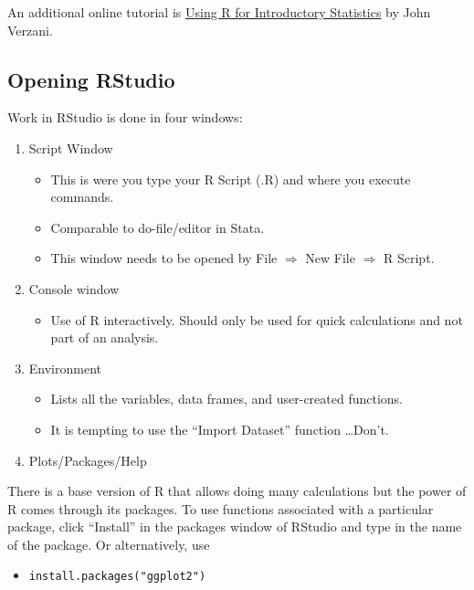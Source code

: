 \documentclass[
]{article}
\providecommand{\tightlist}{%
  \setlength{\itemsep}{0pt}\setlength{\parskip}{0pt}}
\begin{document}
An additional online tutorial is \href{https://cran.r-project.org/doc/contrib/Verzani-SimpleR.pdf\%5D}{Using R for Introductory Statistics} by John Verzani.

\hypertarget{opening-rstudio}{%
\subsection{Opening RStudio}\label{opening-rstudio}}

Work in RStudio is done in four windows:

\begin{enumerate}
\def\labelenumi{\arabic{enumi}.}
\tightlist
\item
  Script Window

  \begin{itemize}
  \tightlist
  \item
    This is were you type your R Script (.R) and where you execute commands.
  \item
    Comparable to do-file/editor in Stata.
  \item
    This window needs to be opened by File \(\Rightarrow\) New File \(\Rightarrow\) R Script.
  \end{itemize}
\item
  Console window

  \begin{itemize}
  \tightlist
  \item
    Use of R interactively. Should only be used for quick calculations and not part of an analysis.
  \end{itemize}
\item
  Environment

  \begin{itemize}
  \tightlist
  \item
    Lists all the variables, data frames, and user-created functions.
  \item
    It is tempting to use the ``Import Dataset'' function \dots Don't.
  \end{itemize}
\item
  Plots/Packages/Help
\end{enumerate}

There is a base version of R that allows doing many calculations but the power of R comes through its packages. To use functions associated with a particular package, click ``Install'' in the packages window of RStudio and type in the name of the package. Or alternatively, use

\begin{itemize}
\tightlist
\item
  \texttt{install.packages("ggplot2")}
\end{itemize}
\end{document}
